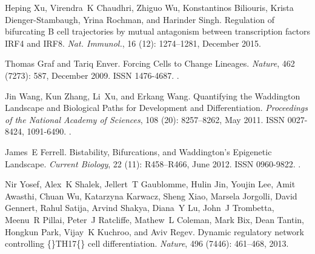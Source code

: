 \documentclass[10pt, a4paper]{article}
\begin{document}
\begin{thebibliography}{59}
	Heping Xu, Virendra~K Chaudhri, Zhiguo Wu, Konstantinos Biliouris, Krista
	{Dienger-Stambaugh}, Yrina Rochman, and Harinder Singh.
	\newblock Regulation of bifurcating {{B}} cell trajectories by mutual
	antagonism between transcription factors {{IRF4}} and {{IRF8}}.
	\newblock \emph{Nat. Immunol.}, 16 (12): 1274--1281, December
	2015.
	
	Thomas Graf and Tariq Enver.
	\newblock Forcing {{Cells}} to {{Change Lineages}}.
	\newblock \emph{Nature}, 462 (7273): 587, December 2009.
	\newblock ISSN 1476-4687.
	\newblock {}.
	
	Jin Wang, Kun Zhang, Li~Xu, and Erkang Wang.
	\newblock Quantifying the {{Waddington Landscape}} and {{Biological Paths}} for
	{{Development}} and {{Differentiation}}.
	\newblock \emph{Proceedings of the National Academy of Sciences}, 108
	(20): 8257--8262, May 2011.
	\newblock ISSN 0027-8424, 1091-6490.
	\newblock {}.
	
	James~E Ferrell.
	\newblock Bistability, {{Bifurcations}}, and {{Waddington}}'s {{Epigenetic
			Landscape}}.
	\newblock \emph{Current Biology}, 22 (11): R458--R466, June
	2012.
	\newblock ISSN 0960-9822.
	\newblock {}.
	
	Nir Yosef, Alex~K Shalek, Jellert~T Gaublomme, Hulin Jin, Youjin Lee, Amit
	Awasthi, Chuan Wu, Katarzyna Karwacz, Sheng Xiao, Marsela Jorgolli, David
	Gennert, Rahul Satija, Arvind Shakya, Diana~Y Lu, John~J Trombetta, Meenu~R
	Pillai, Peter~J Ratcliffe, Mathew~L Coleman, Mark Bix, Dean Tantin, Hongkun
	Park, Vijay~K Kuchroo, and Aviv Regev.
	\newblock Dynamic regulatory network controlling
	\{\vphantom\}{{TH17}}\vphantom\{\} cell differentiation.
	\newblock \emph{Nature}, 496 (7446): 461--468, 2013.
	

\end{thebibliography}
\end{document}
